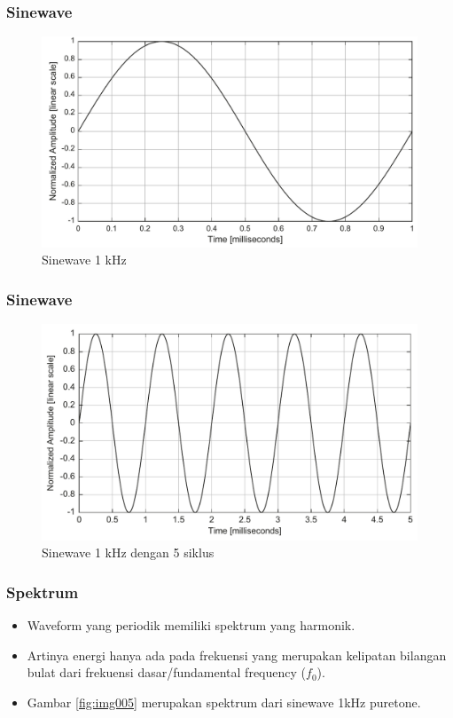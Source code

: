 \documentclass[pdflatex,compress]{beamer}
\begin{document}
\begin{frame}
	\frametitle{Sinewave}
	\begin{figure}
		\centering
		\includegraphics[width=0.7\linewidth]{img/img003}
		\caption{Sinewave 1 kHz}
		\label{fig:img003}
	\end{figure}
\end{frame}

\begin{frame}
	\frametitle{Sinewave}
	\begin{figure}
		\centering
		\includegraphics[width=0.7\linewidth]{img/img004}
		\caption{Sinewave 1 kHz dengan 5 siklus}
		\label{fig:img004}
	\end{figure}
\end{frame}

\begin{frame}
	\frametitle{Spektrum}
	\begin{itemize}
		\item Waveform yang periodik memiliki spektrum yang harmonik.
		\item Artinya energi hanya ada pada frekuensi yang merupakan kelipatan bilangan bulat dari frekuensi dasar/fundamental frequency ($ f_0 $).
		\item Gambar \ref{fig:img005} merupakan spektrum dari sinewave 1kHz puretone.
	\end{itemize}
\end{frame}
\end{document}
